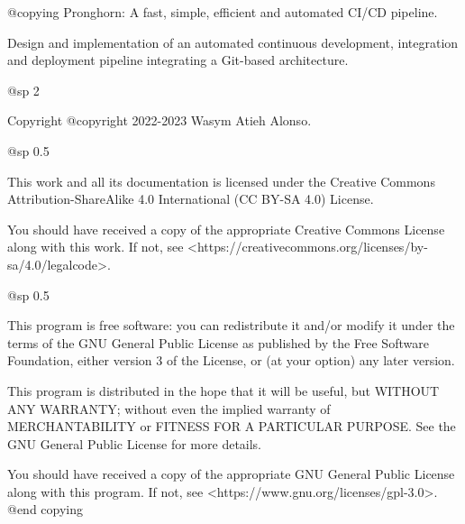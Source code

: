 @copying
Pronghorn: A fast, simple, efficient and automated CI/CD pipeline.

Design and implementation of an automated continuous development, integration and deployment pipeline integrating a Git-based architecture.

@sp 2

Copyright @copyright{} 2022-2023 Wasym Atieh Alonso.

@sp 0.5

This work and all its documentation is licensed under the Creative Commons Attribution-ShareAlike 4.0 International (CC BY-SA 4.0) License.

You should have received a copy of the appropriate Creative Commons License along with this work. If not, see <https://creativecommons.org/licenses/by-sa/4.0/legalcode>.

@sp 0.5

This program is free software: you can redistribute it and/or modify it under the terms of the GNU General Public License as published by the Free Software Foundation, either version 3 of the License, or (at your option) any later version.

This program is distributed in the hope that it will be useful, but WITHOUT ANY WARRANTY; without even the implied warranty of MERCHANTABILITY or FITNESS FOR A PARTICULAR PURPOSE. See the GNU General Public License for more details.

You should have received a copy of the appropriate GNU General Public License along with this program. If not, see <https://www.gnu.org/licenses/gpl-3.0>.
@end copying
